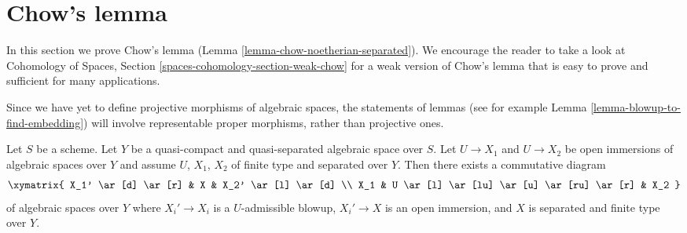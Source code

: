 \section{Chow's lemma}
\label{section-chow}

\noindent
In this section we prove Chow's lemma
(Lemma \ref{lemma-chow-noetherian-separated}).
We encourage the reader to take a look at
Cohomology of Spaces, Section \ref{spaces-cohomology-section-weak-chow}
for a weak version of Chow's lemma that is easy to prove and sufficient
for many applications.

\medskip\noindent
Since we have yet to define projective morphisms of algebraic spaces,
the statements of lemmas (see for example
Lemma \ref{lemma-blowup-to-find-embedding}) will
involve representable proper morphisms, rather than projective ones.

\begin{lemma}
\label{lemma-find-common-blowups}
Let $S$ be a scheme. Let $Y$ be a quasi-compact and quasi-separated
algebraic space over $S$. Let $U \to X_1$ and $U \to X_2$ be open immersions
of algebraic spaces over $Y$ and assume $U$, $X_1$, $X_2$ of finite
type and separated over $Y$. Then there exists a commutative diagram
$$
\xymatrix{
X_1' \ar[d] \ar[r] & X & X_2' \ar[l] \ar[d] \\
X_1 & U \ar[l] \ar[lu] \ar[u] \ar[ru] \ar[r] & X_2
}
$$
of algebraic spaces over $Y$ where $X_i' \to X_i$ is a $U$-admissible
blowup, $X_i' \to X$ is an open immersion, and $X$ is separated and finite
type over $Y$.
\end{lemma}


